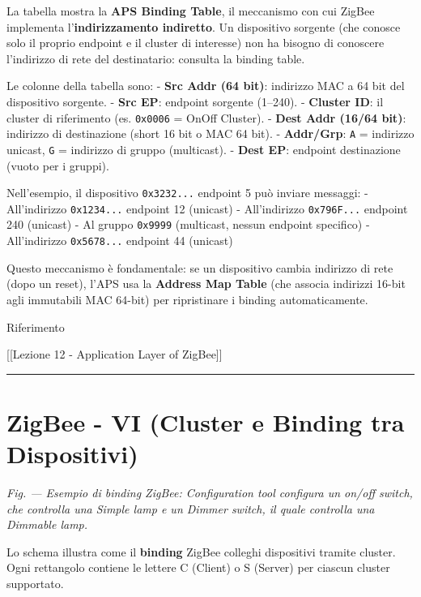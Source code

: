 \documentclass[
  italian,
  openany]{book}
\begin{document}
La tabella mostra la \textbf{APS Binding Table}, il meccanismo con cui
ZigBee implementa l'\textbf{indirizzamento indiretto}. Un dispositivo
sorgente (che conosce solo il proprio endpoint e il cluster di
interesse) non ha bisogno di conoscere l'indirizzo di rete del
destinatario: consulta la binding table.

Le colonne della tabella sono: - \textbf{Src Addr (64 bit)}: indirizzo
MAC a 64 bit del dispositivo sorgente. - \textbf{Src EP}: endpoint
sorgente (1--240). - \textbf{Cluster ID}: il cluster di riferimento (es.
\texttt{0x0006} = OnOff Cluster). - \textbf{Dest Addr (16/64 bit)}:
indirizzo di destinazione (short 16 bit o MAC 64 bit). -
\textbf{Addr/Grp}: \texttt{A} = indirizzo unicast, \texttt{G} =
indirizzo di gruppo (multicast). - \textbf{Dest EP}: endpoint
destinazione (vuoto per i gruppi).

Nell'esempio, il dispositivo \texttt{0x3232...} endpoint 5 può inviare
messaggi: - All'indirizzo \texttt{0x1234...} endpoint 12 (unicast) -
All'indirizzo \texttt{0x796F...} endpoint 240 (unicast) - Al gruppo
\texttt{0x9999} (multicast, nessun endpoint specifico) - All'indirizzo
\texttt{0x5678...} endpoint 44 (unicast)

Questo meccanismo è fondamentale: se un dispositivo cambia indirizzo di
rete (dopo un reset), l'APS usa la \textbf{Address Map Table} (che
associa indirizzi 16-bit agli immutabili MAC 64-bit) per ripristinare i
binding automaticamente.

\begin{calloutnote}{Riferimento}

{[}{[}Lezione 12 - Application Layer of ZigBee{]}{]}

\end{calloutnote}

\begin{center}\rule{0.5\linewidth}{0.5pt}\end{center}

\section{ZigBee - VI (Cluster e Binding tra
Dispositivi)}\label{zigbee---vi-cluster-e-binding-tra-dispositivi}

\emph{Fig. --- Esempio di binding ZigBee: Configuration tool configura
un on/off switch, che controlla una Simple lamp e un Dimmer switch, il
quale controlla una Dimmable lamp.}

Lo schema illustra come il \textbf{binding} ZigBee colleghi dispositivi
tramite cluster. Ogni rettangolo contiene le lettere C (Client) o S
(Server) per ciascun cluster supportato.
\end{document}
